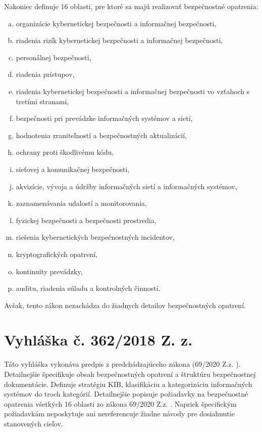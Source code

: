 Nakoniec definuje 16 oblasti, pre ktoré sa majú realizovať bezpečnostné opatrenia: 
\begin{enumerate}[a)]
    \item organizácie kybernetickej bezpečnosti a informačnej bezpečnosti,
    \item riadenia rizík kybernetickej bezpečnosti a informačnej bezpečnosti,
    \item personálnej bezpečnosti,
    \item riadenia prístupov,
    \item riadenia kybernetickej bezpečnosti a informačnej bezpečnosti vo vzťahoch s tretími stranami,
    \item bezpečnosti pri prevádzke informačných systémov a sietí,
    \item hodnotenia zraniteľností a bezpečnostných aktualizácií,
    \item ochrany proti škodlivému kódu,
    \item sieťovej a komunikačnej bezpečnosti,
    \item akvizície, vývoja a údržby informačných sietí a informačných systémov,
    \item zaznamenávania udalostí a monitorovania,
    \item fyzickej bezpečnosti a bezpečnosti prostredia,
    \item riešenia kybernetických bezpečnostných incidentov,
    \item kryptografických opatrení,
    \item kontinuity prevádzky,
    \item auditu, riadenia súladu a kontrolných činností.
\end{enumerate}
Avšak, tento zákon nezachádza do žiadnych detailov bezpečnostných opatrení.   

\section{Vyhláška č. 362/2018 Z. z.}

Táto vyhláška vykonáva predpis z predchádzajúceho zákona (69/2020 Z.z. \cite{69/2018}). Detailnejšie špecifikuje obsah 
bezpečnostných opatrení a štruktúru bezpečnostnej dokumentácie. Definuje stratégiu KIB, klasifikáciu a kategorizáciu 
informačných systémov do troch kategórií. Detailnejšie popisuje požiadavky na bezpečnostné opatrenia všetkých 16 
oblasti zo zákona 69/2020 Z.z. \cite{69/2018}. Napriek špecifickým požiadavkám neposkytuje ani nereferencuje žiadne 
návody pre dosiahnutie stanovených cieľov.

